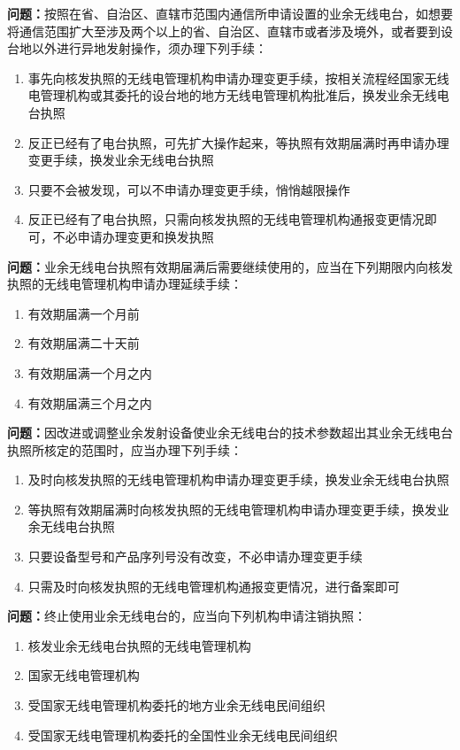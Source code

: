 \documentclass[UTF8]{ctexbook}
\begin{document}
\textbf{问题：}按照在省、自治区、直辖市范围内通信所申请设置的业余无线电台，如想要将通信范围扩大至涉及两个以上的省、自治区、直辖市或者涉及境外，或者要到设台地以外进行异地发射操作，须办理下列手续：
\begin{enumerate}[label=\Alph*), leftmargin=3em]
  \item 事先向核发执照的无线电管理机构申请办理变更手续，按相关流程经国家无线电管理机构或其委托的设台地的地方无线电管理机构批准后，换发业余无线电台执照
  \item 反正已经有了电台执照，可先扩大操作起来，等执照有效期届满时再申请办理变更手续，换发业余无线电台执照
  \item 只要不会被发现，可以不申请办理变更手续，悄悄越限操作
  \item 反正已经有了电台执照，只需向核发执照的无线电管理机构通报变更情况即可，不必申请办理变更和换发执照
\end{enumerate}

\textbf{问题：}业余无线电台执照有效期届满后需要继续使用的，应当在下列期限内向核发执照的无线电管理机构申请办理延续手续：
\begin{enumerate}[label=\Alph*), leftmargin=3em]
  \item 有效期届满一个月前
  \item 有效期届满二十天前
  \item 有效期届满一个月之内
  \item 有效期届满三个月之内
\end{enumerate}

\textbf{问题：}因改进或调整业余发射设备使业余无线电台的技术参数超出其业余无线电台执照所核定的范围时，应当办理下列手续：
\begin{enumerate}[label=\Alph*), leftmargin=3em]
  \item 及时向核发执照的无线电管理机构申请办理变更手续，换发业余无线电台执照
  \item 等执照有效期届满时向核发执照的无线电管理机构申请办理变更手续，换发业余无线电台执照
  \item 只要设备型号和产品序列号没有改变，不必申请办理变更手续
  \item 只需及时向核发执照的无线电管理机构通报变更情况，进行备案即可
\end{enumerate}

\textbf{问题：}终止使用业余无线电台的，应当向下列机构申请注销执照：
\begin{enumerate}[label=\Alph*), leftmargin=3em]
  \item 核发业余无线电台执照的无线电管理机构
  \item 国家无线电管理机构
  \item 受国家无线电管理机构委托的地方业余无线电民间组织
  \item 受国家无线电管理机构委托的全国性业余无线电民间组织
\end{enumerate}
\end{document}
